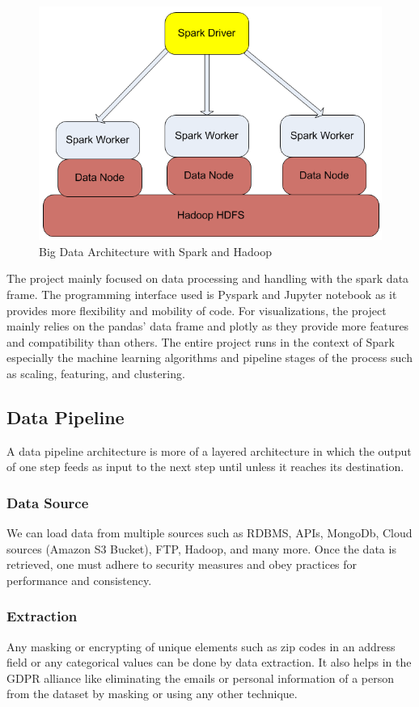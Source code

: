 \documentclass[journal,twoside,web]{ieeecolor}
\begin{document}
\begin{figure}[!t]
\centerline{\includegraphics[width=\columnwidth]{profig3.png}}
\caption{Big Data Architecture with Spark and Hadoop}
\label{fig1}
\end{figure}

The project mainly focused on data processing and handling with the spark data frame. The programming interface used is Pyspark and Jupyter notebook as it provides more flexibility and mobility of code. For visualizations, the project mainly relies on the pandas' data frame and plotly \cite{sievert2020interactive} as they provide more features and compatibility than others. The entire project runs in the context of Spark especially the machine learning algorithms and pipeline stages of the process such as scaling, featuring, and clustering.
\label{sec:guidelines}

\subsection{Data Pipeline}
A data pipeline architecture is more of a layered architecture in which the output of one step feeds as input to the next step until unless it reaches its destination.
\subsubsection{Data Source}
We can load data from multiple sources such as RDBMS, APIs, MongoDb, Cloud sources (Amazon S3 Bucket), FTP, Hadoop, and many more. Once the data is retrieved, one must adhere to security measures and obey practices for performance and consistency.
\subsubsection{Extraction}
Any masking or encrypting of unique elements such as zip codes in an address field or any categorical values can be done by data extraction. It also helps in the GDPR alliance like eliminating the emails or personal information of a person from the dataset by masking or using any other technique.
\end{document}
